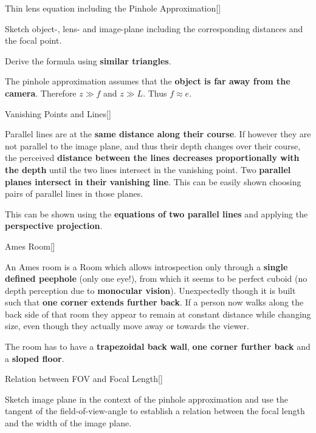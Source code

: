\documentclass[10pt,a4paper]{scrartcl}
\begin{document}
\begin{multicols*}{2}
\begin{QandA}{Thin lens equation including the Pinhole Approximation}[\Derivation]
\item Sketch object-, lens- and image-plane including the corresponding distances and the focal point.
\item Derive the formula using \textbf{similar triangles}.
\item The pinhole approximation assumes that the \textbf{object is far away from the camera}. Therefore $z\gg f$ and $z\gg L$. Thus $f\approx e$. 
\end{QandA}

\begin{QandA}{Vanishing Points and Lines}[\Definition]
\item Parallel lines are at the \textbf{same distance along their course}. If however they are not parallel to the image plane, and thus their depth changes over their course, the perceived \textbf{distance between the lines decreases proportionally with the depth} until the two lines intersect in the vanishing point. Two \textbf{parallel planes intersect in their vanishing line}. This can be easily shown choosing pairs of parallel lines in those planes.
\item This can be shown using the \textbf{equations of two parallel lines} and applying the \textbf{perspective projection}.
\end{QandA}

\begin{QandA}{Ames Room}[\Definition]
\item An Ames room is a Room which allows introspection only through a \textbf{single defined peephole} (only one eye!), from which it seems to be perfect cuboid (no depth perception due to \textbf{monocular vision}). Unexpectedly though it is built such that \textbf{one corner extends further back}. If a person now walks along the back side of that room they appear to remain at constant distance while changing size, even though they actually move away or towards the viewer.
\item The room has to have a \textbf{trapezoidal back wall}, \textbf{one corner further back} and a \textbf{sloped floor}. 
\end{QandA}

\begin{QandA}{Relation between FOV and Focal Length}[\Derivation]
\item Sketch image plane in the context of the pinhole approximation and use the tangent of the field-of-view-angle to establish a relation between the focal length and the width of the image plane.
\end{QandA}


\end{multicols*}
\end{document}
